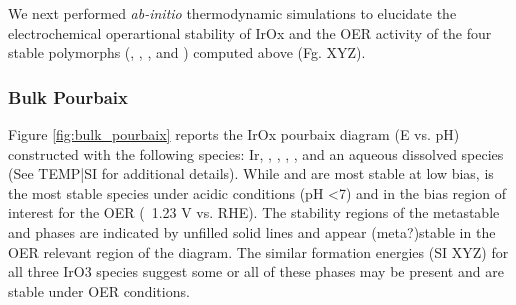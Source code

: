 %


We next performed {\it ab-initio} thermodynamic simulations to elucidate the electrochemical operartional stability of IrOx and the OER activity of the four stable polymorphs (\rIrOtwo, \aIrOthree, \rIrOthree, and \bIrOthree) computed above (Fg. XYZ).


\subsubsection{Bulk Pourbaix}
%
Figure \ref{fig:bulk_pourbaix} reports the IrOx pourbaix diagram (E vs. pH) constructed with the following species: Ir, \rIrOtwo, \aIrOthree,  \rIrOthree, \bIrOthree, and an aqueous dissolved  species (See TEMP|SI for additional details).
%
While \Ir and \rIrOtwo are most stable at low bias, \aIrOthree is the most stable species under acidic conditions (pH \textless 7) and in the bias region of interest for the OER (~1.23 V vs. RHE).
%
%
The stability regions of the metastable \rIrOthree and \bIrOthree phases are indicated by unfilled solid lines and appear (meta?)stable in the OER relevant region of the diagram.
%
The similar formation energies (SI XYZ) for all three IrO3 species suggest some or all of these  phases may be present and are stable under OER conditions.

